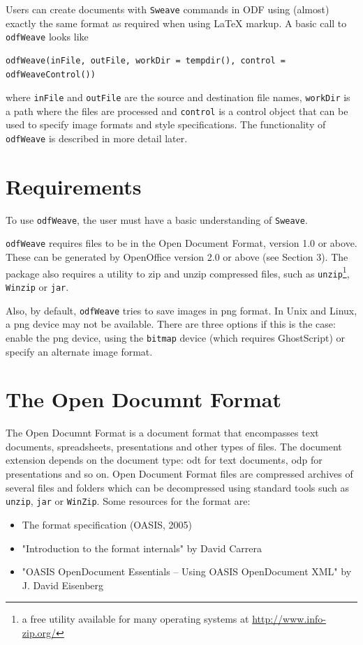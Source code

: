 \documentclass[12pt]{article}
\newcommand{\odfWeave}{{\tt odfWeave}\xspace}
\newcommand{\odfWeaveFunc}{{\tt odfWeave}\xspace}
\begin{document}
Users can create documents with \texttt{Sweave} commands in ODF using (almost) exactly the same format as required when using \LaTeX{} markup. A basic call to \odfWeaveFunc looks like
\begin{verbatim}
odfWeave(inFile, outFile, workDir = tempdir(), control = odfWeaveControl())
\end{verbatim}
where \texttt{inFile} and \texttt{outFile} are the source and destination file names, \texttt{workDir} is a path where the files are processed and \texttt{control} is a control object that can be used to specify image formats and style specifications. The functionality of \odfWeave is described in more detail later.

\section{Requirements}

To use \odfWeave, the user must have a basic understanding of \texttt{Sweave}.

\odfWeave  requires files to be in the Open Document Format, version 1.0 or above. These can be generated by OpenOffice version 2.0 or above (see Section 3). The package also requires a utility to zip and unzip compressed files, such as \texttt{unzip}\footnote{a free utility available for many operating systems at  \href{http://www.info-zip.org/} {http://www.info-zip.org/}}, \texttt{Winzip} or \texttt{jar}.

Also, by default, \odfWeaveFunc tries to save images in png format. In Unix and Linux, a png device may not be available. There are three options if this is the case: enable the png device, using the \texttt{bitmap} device (which requires GhostScript) or specify an alternate image format.



\section{The Open Documnt Format}

The Open Documnt Format is a document format that encompasses text documents, spreadsheets, presentations and other types of files. The document extension depends on the document type: odt for text documents, odp for presentations and so on. Open Document Format files are compressed archives of several files and folders which can be decompressed using standard tools such as \texttt{unzip}, \texttt{jar} or \texttt{WinZip}. Some resources for the format are:
\begin{itemize}
\item The format specification (OASIS, 2005)
\item "Introduction to the format internals" by David Carrera
\item "OASIS OpenDocument Essentials -- Using OASIS OpenDocument XML" by J. David Eisenberg
\end{itemize}
\end{document}
